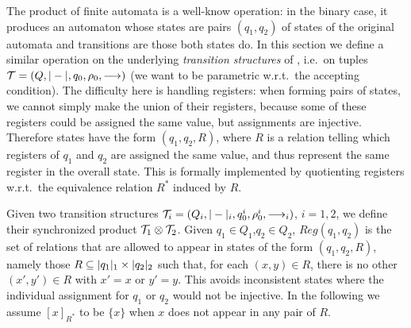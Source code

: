\newcommand{\eq}[1]{#1}
\newcommand{\syncQ}{Q_{\syncp}}
\newcommand{\syncW}[1]{\weight{#1}_{\syncp}}
\newcommand{\syncAss}{\rho_0^{\syncp}}
\newcommand{\syncInit}{q_0^{\syncp}}
\newcommand{\syncTr}[1]{\xymatrix@C-=4ex{\ar[r]^{#1}&\!_{\syncp}}}
\newcommand{\syncHtr}[2]{\xymatrix@C-=4ex{\ar[r]^{#1}_{#2}&\!_{\syncp}}}
\newcommand{\regrule}{\textsc{(Reg)}}
\newcommand{\allrule}{\textsc{(Alloc)}}
\newcommand{\cproj}{\pi}

The product of finite automata is a well-know operation: in the binary case, it produces an automaton whose states are pairs $(q_1,q_2)$ of states of the original automata and transitions are those both states do. In this section we define a similar operation on the underlying \emph{transition structures} of \hdmas{}, i.e.\ on tuples $\mathcal{T} = (Q,|-|,q_0,\rho_0,\longrightarrow)$ (we want to be parametric w.r.t.\ the accepting condition). The difficulty here is handling registers: when forming pairs of states, we cannot simply make the union of their registers, because some of these registers could be assigned the same value, but assignments are injective. Therefore states have the form $(q_1,q_2,R)$, where $R$ is a relation telling which registers of $q_1$ and $q_2$ are assigned the same value, and thus represent the same register in the overall state. This is formally implemented by quotienting registers w.r.t.\ the equivalence relation $R^*$ induced by $R$.

Given two transition structures $\mathcal{T}_i = (Q_i,|-|_i,q_0^i,\rho_0^i,\longrightarrow_i)$, $i=1,2$, we define their synchronized product $\mathcal{T}_1 \otimes \mathcal{T}_2$. Given $q_1 \in Q_1$,$q_2 \in Q_2$, $Reg(q_1,q_2)$ is the set of relations that are allowed to appear in states of the form $(q_1,q_2,R)$, namely those $R \subseteq |q_1|_1 \times |q_2|_2$ such that, for each $(x,y) \in R$, there is no other $(x',y') \in R$ with $x'=x$ or $y'=y$. This avoids inconsistent states where the individual assignment for $q_1$ or $q_2$ would not be injective. In the following we assume $[x]_{R^*}$ to be $\{x\}$ when $x$ does not appear in any pair of $R$.



